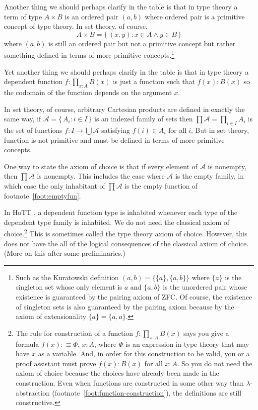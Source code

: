 \documentclass[11pt]{article}
\newcommand{\set}[1]{\{\,#1\,\}}
\begin{document}
Another thing we should perhaps clarify in the table is that in type theory
a term of type $A \times B$ is an ordered pair $(a, b)$ where ordered pair
is a primitive concept of type theory.  In set theory, of course,
$$
   A \times B = \set{ (x, y) : x \in A \wedge y \in B }
$$
where $(a, b)$ is still an ordered pair but not a primitive concept
but rather something defined in terms of
more primitive concepts.\footnote{Such as the Kuratowski definition
$(a, b) = \{\{a\}, \{a, b\}\}$ where $\{a\}$ is the singleton set whose
only element is $a$ and $\{a, b\}$ is the unordered pair whose existence
is guaranteed by the pairing axiom of ZFC.  Of course, the existence
of singleton sets is also guaranteed by the pairing axiom because by
the axiom of extensionality $\{a\} = \{a, a\}$.}

Yet another thing we should perhaps clarify in the table is that in type theory
a dependent function $f : \prod_{x : A} B(x)$ is just a function such
that $f(x) : B(x)$ so the codomain of the function depends on
the argument $x$.

In set theory, of course, arbitrary Cartesian
products are defined in exactly the same way,
if $\mathcal{A} = \set{ A_i : i \in I }$ is an
indexed family of sets then $\prod \mathcal{A} = \prod_{i \in I} A_i$
is the set of functions $f : I \to \bigcup \mathcal{A}$
satisfying $f(i) \in A_i$ for all $i$.
But in set theory, function is not primitive and must be defined in terms
of more primitive concepts.

One way to state the axiom of choice is
that if every element of $\mathcal{A}$ is nonempty, then $\prod \mathcal{A}$
is nonempty.  This includes the case where $\mathcal{A}$ is the empty family,
in which case the only inhabitant of $\prod \mathcal{A}$ is 
the empty function of footnote~\ref{foot:emptyfun}.

In HoTT , a dependent function type
is inhabited whenever each type of the dependent type family is inhabited.
We do not need the classical axiom of choice.\footnote{The rule for
construction of a function
$f : \prod_{x : A} B(x)$ says you give a formula $f(x) :\equiv \Phi$,
$x : A$, where
$\Phi$ is an expression in type theory that may have $x$ as a variable.
And, in order for this construction to be valid, you or a proof assistant
must prove $f(x) : B(x)$ for all $x : A$.  So you do not need the axiom
of choice because the choices have already been made in the construction.
Even when functions are constructed in some other way than
$\lambda$-abstraction (footnote~\ref{foot:function-construction}),
the definitions are still constructive.}
This is sometimes called the type theory axiom of choice.
However, this does not have the all of the logical consequences of the
classical axiom of choice.  (More on this after some preliminaries.)
\end{document}
